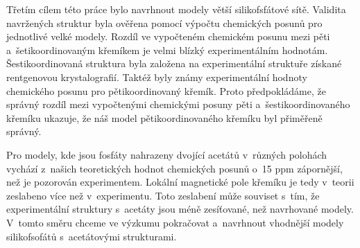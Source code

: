 \documentclass[
digital, %
table,   %
lof,     %
lot,     %
oneside,
]{fithesis3}
\begin{document}
Třetím cílem této práce bylo navrhnout modely větší silikofsfátové sítě. Validita navržených struktur byla ověřena pomocí výpočtu chemických posunů pro jednotlivé velké modely. Rozdíl ve vypočteném chemickém posunu mezi pěti a~šetikoordinovaným křemíkem je velmi blízký experimentálním hodnotám.  Šestikoordinovaná struktura byla založena na experimentální struktuře získané rentgenovou krystalografií. Taktéž byly známy experimentální hodnoty chemického posunu pro pětikoordinovaný křemík. Proto předpokládáme, že správný rozdíl mezi vypočtenými chemickými posuny pěti a~šestikoordinovaného křemíku ukazuje, že náš model pětikoordinovaného křemíku byl přiměřeně správný.

Pro modely, kde jsou fosfáty nahrazeny dvojící acetátů v~různých polohách vychází z~našich teoretických hodnot chemických posunů o~15 ppm zápornější, než je pozorován experimentem. Lokální magnetické pole křemíku je tedy v~teorii zeslabeno více než v~experimentu. Toto zeslabení může souviset s~tím, že experimentální struktury s~acetáty jsou méně zesíťované, než navrhované modely. V~tomto směru chceme ve výzkumu pokračovat a~navrhnout vhodnější modely silikofsofátů s~acetátovými strukturami.




\newpage
\end{document}
